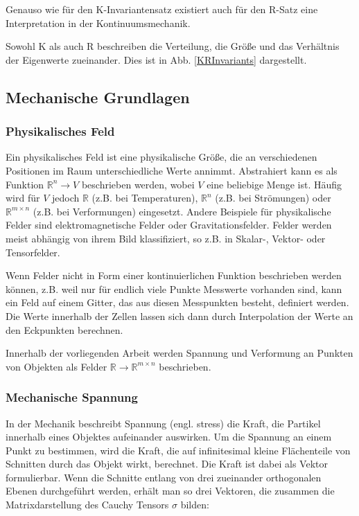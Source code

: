 \documentclass[a4paper,fontsize=12pt,toc=bib,halfparskip]{scrartcl}
\begin{document}
Genauso wie f\"ur den K-Invariantensatz existiert auch f\"ur den R-Satz eine Interpretation in der Kontinuumsmechanik. 

Sowohl K als auch R beschreiben die Verteilung, die Gr\"o{\ss}e und das Verh\"altnis der Eigenwerte zueinander. Dies ist in Abb. \ref{KRInvariants} dargestellt. 

\subsection{Mechanische Grundlagen}
\subsubsection{Physikalisches Feld}
Ein physikalisches Feld ist eine physikalische Gr\"o{\ss}e, die an verschiedenen Positionen im Raum unterschiedliche Werte annimmt\cite[1–2 Electric and magnetic fields]{feynman2011feynman}. Abstrahiert kann es als Funktion $\mathbb{R}^n \rightarrow V$ beschrieben werden, wobei $V$ eine beliebige Menge ist. H\"aufig wird f\"ur $V$ jedoch $\mathbb{R}$ (z.B. bei Temperaturen), $\mathbb{R}^n$ (z.B. bei Str\"omungen) oder $\mathbb{R}^{m\times n}$ (z.B. bei Verformungen) eingesetzt. Andere Beispiele f\"ur physikalische Felder sind elektromagnetische Felder oder Gravitationsfelder. Felder werden meist abh\"angig von ihrem Bild klassifiziert, so z.B. in Skalar-, Vektor- oder Tensorfelder.

Wenn Felder nicht in Form einer kontinuierlichen Funktion beschrieben werden k\"onnen, z.B. weil nur f\"ur endlich viele Punkte Messwerte vorhanden sind, kann ein Feld auf einem Gitter, das aus diesen Messpunkten besteht, definiert werden. Die Werte innerhalb der Zellen lassen sich dann durch Interpolation der Werte an den Eckpunkten berechnen.


Innerhalb der vorliegenden Arbeit werden Spannung und Verformung an Punkten von Objekten als Felder $\mathbb{R} \rightarrow \mathbb{R}^{m\times n}$ beschrieben.


\subsubsection{Mechanische Spannung}
In der Mechanik beschreibt Spannung (engl. stress) die Kraft, die Partikel innerhalb eines Objektes aufeinander auswirken. Um die Spannung an einem Punkt zu bestimmen, wird die Kraft, die auf infinitesimal kleine Fl\"achenteile von Schnitten durch das Objekt wirkt, berechnet. Die Kraft ist dabei als Vektor formulierbar. Wenn die Schnitte entlang von drei zueinander orthogonalen Ebenen durchgef\"uhrt werden, erh\"alt man so drei Vektoren, die zusammen die Matrixdarstellung des Cauchy Tensors $\sigma$ bilden:
\end{document}
